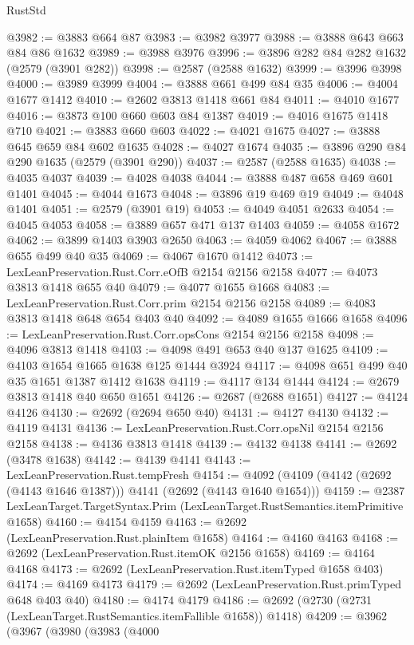 \begin{lexlean}{RustStd}
\begin{coremodule}
{\begin{coremodule}
{{{{{{{{{{@3982 := @3883 @664 @87
@3983 := @3982 @3977
@3988 := @3888 @643 @663 @84 @86 @1632
@3989 := @3988 @3976
@3996 := @3896 @282 @84 @282 @1632 (@2579 (@3901 @282))
@3998 := @2587 (@2588 @1632)
@3999 := @3996 @3998
@4000 := @3989 @3999
@4004 := @3888 @661 @499 @84 @35
@4006 := @4004 @1677 @1412
@4010 := @2602 @3813 @1418 @661 @84
@4011 := @4010 @1677
@4016 := @3873 @100 @660 @603 @84 @1387
@4019 := @4016 @1675 @1418 @710
@4021 := @3883 @660 @603
@4022 := @4021 @1675
@4027 := @3888 @645 @659 @84 @602 @1635
@4028 := @4027 @1674
@4035 := @3896 @290 @84 @290 @1635 (@2579 (@3901 @290))
@4037 := @2587 (@2588 @1635)
@4038 := @4035 @4037
@4039 := @4028 @4038
@4044 := @3888 @487 @658 @469 @601 @1401
@4045 := @4044 @1673
@4048 := @3896 @19 @469 @19
@4049 := @4048 @1401
@4051 := @2579 (@3901 @19)
@4053 := @4049 @4051 @2633
@4054 := @4045 @4053
@4058 := @3889 @657 @471 @137 @1403
@4059 := @4058 @1672
@4062 := @3899 @1403 @3903 @2650
@4063 := @4059 @4062
@4067 := @3888 @655 @499 @40 @35
@4069 := @4067 @1670 @1412
@4073 := LexLeanPreservation.Rust.Corr.eOfB @2154 @2156 @2158
@4077 := @4073 @3813 @1418 @655 @40
@4079 := @4077 @1655 @1668
@4083 := LexLeanPreservation.Rust.Corr.prim @2154 @2156 @2158
@4089 := @4083 @3813 @1418 @648 @654 @403 @40
@4092 := @4089 @1655 @1666 @1658
@4096 := LexLeanPreservation.Rust.Corr.opsCons @2154 @2156 @2158
@4098 := @4096 @3813 @1418
@4103 := @4098 @491 @653 @40 @137 @1625
@4109 := @4103 @1654 @1665 @1638 @125 @1444 @3924
@4117 := @4098 @651 @499 @40 @35 @1651 @1387 @1412 @1638
@4119 := @4117 @134 @1444
@4124 := @2679 @3813 @1418 @40 @650 @1651
@4126 := @2687 (@2688 @1651)
@4127 := @4124 @4126
@4130 := @2692 (@2694 @650 @40)
@4131 := @4127 @4130
@4132 := @4119 @4131
@4136 := LexLeanPreservation.Rust.Corr.opsNil @2154 @2156 @2158
@4138 := @4136 @3813 @1418
@4139 := @4132 @4138
@4141 := @2692 (@3478 @1638)
@4142 := @4139 @4141
@4143 := LexLeanPreservation.Rust.tempFresh
@4154 := @4092 (@4109 (@4142 (@2692 (@4143 @1646 @1387))) @4141 (@2692 (@4143 @1640 @1654)))
@4159 := @2387 LexLeanTarget.TargetSyntax.Prim (LexLeanTarget.RustSemantics.itemPrimitive @1658)
@4160 := @4154 @4159
@4163 := @2692 (LexLeanPreservation.Rust.plainItem @1658)
@4164 := @4160 @4163
@4168 := @2692 (LexLeanPreservation.Rust.itemOK @2156 @1658)
@4169 := @4164 @4168
@4173 := @2692 (LexLeanPreservation.Rust.itemTyped @1658 @403)
@4174 := @4169 @4173
@4179 := @2692 (LexLeanPreservation.Rust.primTyped @648 @403 @40)
@4180 := @4174 @4179
@4186 := @2692 (@2730 (@2731 (LexLeanTarget.RustSemantics.itemFallible @1658)) @1418)
@4209 := @3962
    (@3967
      (@3980
        (@3983
          (@4000
}}}}}}}}}}
\end{coremodule}}
\end{coremodule}
\end{lexlean}
